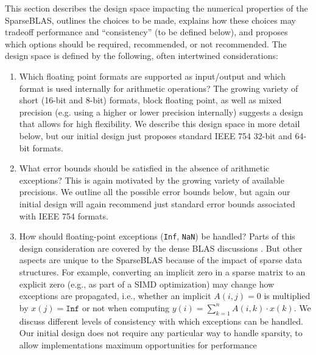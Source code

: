 \documentclass[manuscript,review]{acmart}
\newcommand{\JimD}[1]{{\color{red}(Jim D) #1}}
\newcommand{\ignore}[1]{}
\begin{document}

This section describes the design space impacting the
numerical properties of the SparseBLAS, outlines the
choices to be made, explains how these choices may tradeoff performance and ``consistency'' (to be defined below), 
and proposes which options should be required, recommended, 
or not recommended. 
The design space is defined by the following, often intertwined considerations:

\begin{enumerate}
    \item
    Which floating point formats are supported as input/output and 
    which format is used internally for arithmetic operations?
    The growing variety of short (16-bit and 8-bit) formats, 
    block floating point, as well as
    mixed precision (e.g. using a higher or lower precision internally) suggests a design that allows for high flexibility. We describe this design space in more
    detail below, but our initial design just proposes
    standard IEEE 754 32-bit and 64-bit formats. %
    \item What error bounds should be satisfied in the
    absence of arithmetic exceptions? This is again 
    motivated by the growing variety of available precisions.
    We outline all the possible error bounds below, but again
    our initial design will again recommend just standard error bounds associated with
    IEEE 754 formats.
    \item How should floating-point exceptions (\texttt{Inf}, \texttt{NaN}) be handled?
    Parts of this design consideration are covered by the 
    dense BLAS discussions \cite{Proposed_BLAS_LAPACK_exception_handling}. But other aspects are unique
to the SparseBLAS because of the impact of sparse data structures. For example, converting an implicit zero in
a sparse matrix to an explicit zero (e.g., as part of a
SIMD optimization) may change how exceptions are 
propagated, i.e., whether an implicit $A(i,j)=0$ is
multiplied by $x(j) = \texttt{Inf}$ or not when computing
$y(i) = \sum_{k=1}^n A(i,k) \cdot x(k)$. We discuss
different levels of consistency with which exceptions
can be handled. Our initial design does not require any particular way to handle
sparsity, to allow implementations maximum opportunities for performance

\end{enumerate}
\end{document}
